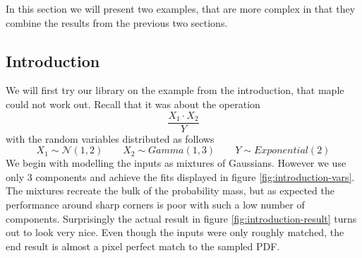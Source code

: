 \documentclass[11pt,a4paper]{book}
\begin{document}
In this section we will present two examples, that are more complex in that they
combine the results from the previous two sections.

\subsection{Introduction}

We will first try our library on the example from the introduction, that maple
could not work out. Recall that it was about the operation
\begin{equation*}
  \frac{X_{1} \cdot X_{2}}{Y}
\end{equation*}
with the random variables distributed as follows
\begin{equation*}
  X_{1} \sim \mathcal{N}(1, 2) \qquad X_{2} \sim Gamma(1, 3) \qquad Y \sim Exponential(2)
\end{equation*}
We begin with modelling the inputs as mixtures of Gaussians. However we use only
$3$ components and achieve the fits displayed in figure
\ref{fig:introduction-vars}. The mixtures recreate the bulk of the probability
mass, but as expected the performance around sharp corners is poor with such a
low number of components. Surprisingly the actual result in figure
\ref{fig:introduction-result} turns out to look very nice. Even though the
inputs were only roughly matched, the end result is almost a pixel perfect match
to the sampled PDF.
\end{document}
